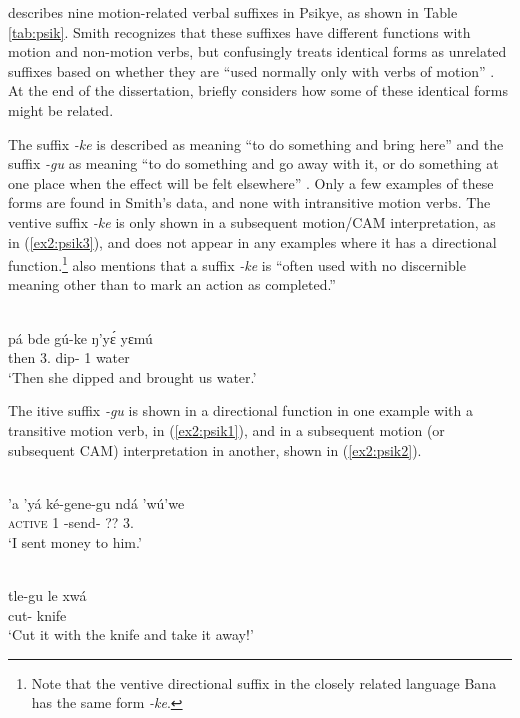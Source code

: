 \citet{smithKapsikiLanguage1969} describes nine motion-related verbal suffixes in Psikye, as shown in Table \ref{tab:psik}. Smith recognizes that these suffixes have different functions with motion and non-motion verbs, but confusingly treats identical forms as unrelated suffixes based on whether they are ``used normally only with verbs of motion'' \citep[113]{smithKapsikiLanguage1969}. At the end of the dissertation, \citet[163--164]{smithKapsikiLanguage1969} briefly considers how some of these identical forms might be related. 

The suffix \textit{-ke} is described as meaning ``to do something and bring here'' and the suffix \textit{-gu} as meaning ``to do something and go away with it, or do something at one place when the effect will be felt elsewhere'' \citep[113--114]{smithKapsikiLanguage1969}. Only a few examples of these forms are found in Smith's data, and none with intransitive motion verbs. The ventive suffix \textit{-ke} is only shown in a subsequent motion/CAM interpretation, as in (\ref{ex2:psik3}), and does not appear in any examples where it has a directional function.\footnote{Note that the ventive directional suffix in the closely related language Bana has the same form \textit{-ke}.} \citet[165]{smithKapsikiLanguage1969} also mentions that a suffix \textit{-ke} is ``often used with no discernible meaning other than to mark an action as completed.'' 

\ea\label{ex2:psik3}
 \\
\gll pá bde gú-ke ŋ'yɛ́ yɛmú	\\
then 3. dip- 1 water	\\
\glt `Then she dipped and brought us water.'
\z 	

The itive suffix \textit{-gu} is shown in a directional function in one example with a transitive motion verb, in (\ref{ex2:psik1}), and in a subsequent motion (or subsequent CAM) interpretation in another, shown in (\ref{ex2:psik2}).

\ea\label{ex2:psik1}
 \\
\gll ’a ’yá ké-gene-gu ndá 'wú'we \\
\textsc{active} 1 -send- ?? 3.	\\
\glt `I sent money to him.'

\ex\label{ex2:psik2}
 \\
\gll  tle-gu le xwá	\\
cut-  knife	\\
\glt `Cut it with the knife and take it away!'
\z 

